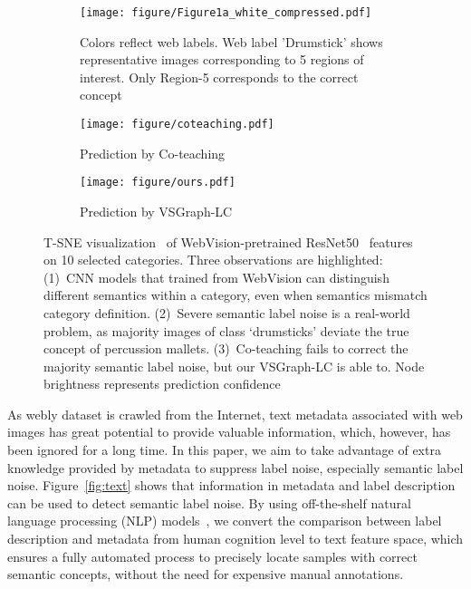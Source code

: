 \documentclass[sigconf]{acmart}
\begin{document}
\begin{figure}[!t]
	\label{fig:intro}
	\centering
	\begin{subfigure}{.46\textwidth}
		\centering
\texttt{[image: figure/Figure1a\_white\_compressed.pdf]}  
		\caption{Colors reflect web labels. Web label 'Drumstick' shows representative images corresponding to 5 regions of interest. Only Region-5 corresponds to the correct concept}
		\label{fig:intro-1}
	\end{subfigure}
	
	\begin{subfigure}{.23\textwidth}
		\centering
\texttt{[image: figure/coteaching.pdf]}  
		\caption{Prediction by Co-teaching}
		\label{fig:intro-coteaching}
	\end{subfigure}
	\begin{subfigure}{.23\textwidth}
		\centering
\texttt{[image: figure/ours.pdf]}  
		\caption{Prediction by VSGraph-LC}
		\label{fig:intro-ours}
	\end{subfigure}
	
	\caption{T-SNE visualization~\cite{maaten2008visualizing} of WebVision-pretrained ResNet50~\cite{he2016deep} features on 10 selected categories. Three observations are highlighted: (1)~CNN models that trained from WebVision can distinguish different semantics within a category, even when semantics mismatch category definition. (2)~Severe semantic label noise is a real-world problem, as majority images of class `drumsticks' deviate the true concept of percussion mallets. (3)~Co-teaching fails to correct the majority semantic label noise, but our VSGraph-LC is able to. Node brightness represents prediction confidence}
	\label{fig:intro_tsne}
\end{figure}

As webly dataset is crawled from the Internet, text metadata associated with web images 
has great potential to provide valuable information, which, however, has been ignored for a long time. In this paper, we aim to take advantage of extra knowledge provided by metadata to suppress label noise, especially semantic label noise.
Figure~\ref{fig:text} shows that information in metadata and label description can be used to detect semantic label noise. By using off-the-shelf natural language processing (NLP) models~\cite{yang2019xlnet}, we convert the comparison between label description and metadata from human cognition level to text feature space, which ensures a fully automated process to precisely locate samples with correct semantic concepts, without the need for expensive manual annotations.
	
\end{document}
